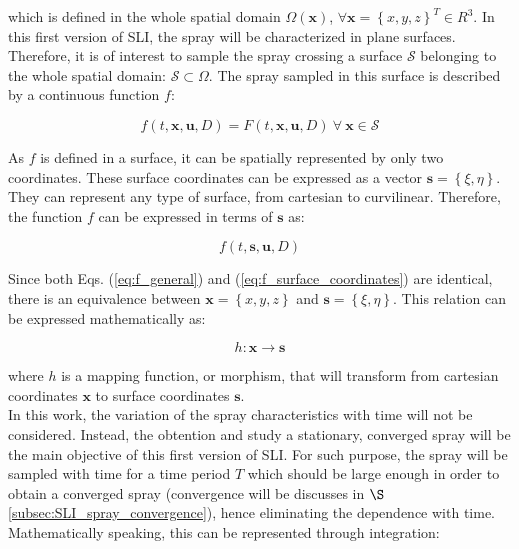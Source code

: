 which is defined in the whole spatial domain $\Omega \left( \boldsymbol{x} \right)$, $\forall \boldsymbol{x} = \left\lbrace x, y, z \right\rbrace^T \in {R}^3$. In this first version of SLI, the spray will be characterized in plane surfaces. Therefore, it is of interest to sample the spray crossing a surface $\mathcal{S}$ belonging to the whole spatial domain: $\mathcal{S} \subset \Omega $. The spray sampled in this surface is described by a continuous function $f$:

\begin{equation}
\label{eq:f_general}
 f \left( t, \textbf{x}, \textbf{u}, D \right) = F \left( t, \textbf{x}, \textbf{u}, D \right) ~ \forall ~ \textbf{x} \in \mathcal{S}
\end{equation}

As $f$ is defined in a surface, it can be spatially represented by only two coordinates. These surface coordinates can be expressed as a vector $\boldsymbol{s} = \left\lbrace \xi, \eta \right\rbrace$. They can represent any type of surface, from cartesian to curvilinear. Therefore, the function $f$ can be expressed in terms of $\boldsymbol{s}$ as:

\begin{equation}
\label{eq:f_surface_coordinates}
f \left( t, \boldsymbol{s}, \textbf{u}, D \right)  
\end{equation}

Since both Eqs. (\ref{eq:f_general}) and (\ref{eq:f_surface_coordinates}) are identical, there is an equivalence between $\boldsymbol{x} = \left\lbrace x, y, z \right\rbrace$ and $\boldsymbol{s} = \left\lbrace \xi, \eta \right\rbrace$. This relation can be expressed mathematically as:

\begin{equation}
\label{eq:morphism_general_definition}
h : \boldsymbol{x} \rightarrow \boldsymbol{s}
\end{equation}


where $h$ is a mapping function, or morphism, that will transform from cartesian coordinates $\boldsymbol{x}$ to surface coordinates $\boldsymbol{s}$. \\


In this work, the variation of the spray characteristics with time will not be considered. Instead, the obtention and study a stationary, converged spray will be the main objective of this first version of SLI. For such purpose, the spray will be sampled with time for a time period $T$ which should be large enough in order to obtain a converged spray (convergence will be discusses in $\S$\ref{subsec:SLI_spray_convergence}), hence eliminating the dependence with time. Mathematically speaking, this can be represented through integration:

